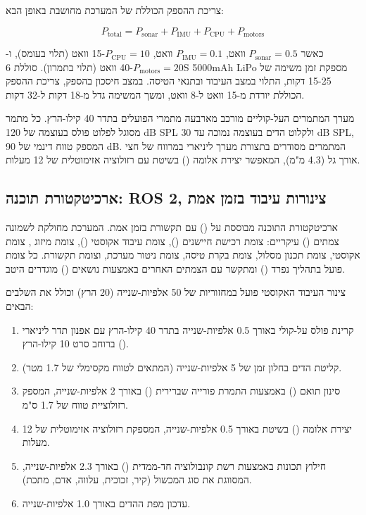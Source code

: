 צריכת ההספק הכוללת של המערכת מחושבת באופן הבא:

\begin{equation}
P_{\text{total}} = P_{\text{sonar}} + P_{\text{IMU}} + P_{\text{CPU}} + P_{\text{motors}}
\label{eq:ch07_power_consumption}
\end{equation}

כאשר $P_{\text{sonar}} = 0.5$ וואט, $P_{\text{IMU}} = 0.1$ וואט, $P_{\text{CPU}} = 10$-15 וואט (תלוי בעומס), ו-$P_{\text{motors}} = 20$-40 וואט (תלוי בתמרון). סוללת 6S 5000mAh LiPo מספקת זמן משימה של 15-25 דקות, התלוי במצב העיבוד ובתנאי הטיסה. במצב חיסכון בהספק, צריכת ההספק הכוללת יורדת מ-15 וואט ל-8 וואט, ומשך המשימה גדל מ-18 דקות ל-32 דקות. \cite{CrewAIDocs}

מערך המתמרים העל-קוליים מורכב מארבעה מתמרי  הפועלים בתדר 40 קילו-הרץ. כל מתמר מסוגל לפלוט פולס בעוצמה של 120 dB SPL ולקלוט הדים בעוצמה נמוכה עד 30 dB SPL, המספק טווח דינמי של 90 dB. המתמרים מסודרים בתצורת מערך ליניארי במרווח של חצי אורך גל (4.3 מ"מ), המאפשר יצירת אלומה () בשיטת  עם רזולוציה אזימוטלית של 12 מעלות. \cite{Thrun2005ProbRobotics}

\subsection{ארכיטקטורת תוכנה: ROS 2, צינורות עיבוד בזמן אמת}
\label{sec:ch07_software}

ארכיטקטורת התוכנה מבוססת על  () עם תקשורת  בזמן אמת. המערכת מחולקת לשמונה צמתים () עיקריים: צומת רכישת חיישנים (), צומת עיבוד אקוסטי (), צומת מיזוג , צומת  אקוסטי, צומת תכנון מסלול, צומת בקרת טיסה, צומת ניטור מערכת, וצומת תקשורת. כל צומת פועל בתהליך נפרד () ומתקשר עם הצמתים האחרים באמצעות נושאים () מוגדרים היטב. \cite{CrewAIDocs}

צינור העיבוד האקוסטי פועל במחזוריות של 50 אלפיות-שנייה (20 הרץ) וכולל את השלבים הבאים:

\begin{enumerate}
    \item קרינת פולס על-קולי באורך 0.5 אלפיות-שנייה בתדר 40 קילו-הרץ עם אפנון תדר ליניארי () ברוחב סרט 10 קילו-הרץ.
    \item קליטת הדים בחלון זמן של 5 אלפיות-שנייה (המתאים לטווח מקסימלי של 1.7 מטר).
    \item סינון תואם () באמצעות התמרת פורייה שברירית () באורך 2 אלפיות-שנייה, המספק רזולוציית טווח של 1.7 ס"מ.
    \item יצירת אלומה () בשיטת  באורך 0.5 אלפיות-שנייה, המספקת רזולוציה אזימוטלית של 12 מעלות.
    \item חילוץ תכונות באמצעות רשת קונבולוציה חד-ממדית () באורך 2.3 אלפיות-שנייה, המסווגת את סוג המכשול (קיר, זכוכית, עלווה, אדם, מתכת).
    \item עדכון מפת ההדים באורך 1.0 אלפיות-שנייה.
\end{enumerate}


